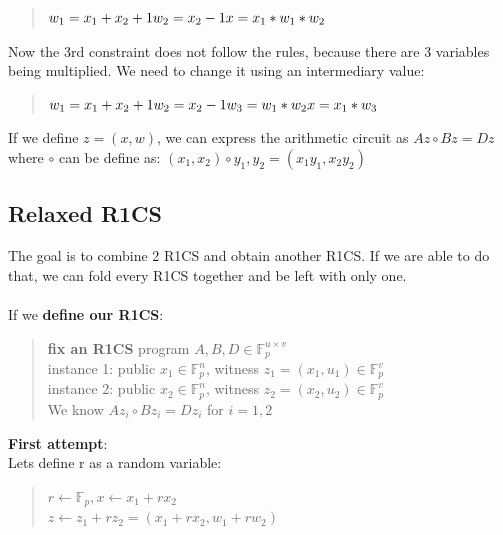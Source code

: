     \begin{quote}
    $w_1 = x_1+x_2+1
    \\
    w_2 = x_2 -1
    \\
    x = x_1*w_1*w_2$
    \end{quote}

    Now the 3rd constraint does not follow the rules, because there are 3 variables being multiplied.
    We need to change it using an intermediary value:
    
    \begin{quote}
    $w_1 = x_1+x_2+1
    \\
    w_2 = x_2 -1
    \\
    w_3 = w_1*w_2
    \\
    x = x_1*w_3$
    \end{quote}
    \cite{ZKM3}

    If we define $z=(x,w)$, we can express the arithmetic circuit as $ Az \circ Bz = Dz$
    where $\circ$ can be define as: $(x_1, x_2) \circ y_1, y_2 = (x_1y_1, x_2y_2)$
\cite{ZKM10}

\subsection{Relaxed R1CS}
The goal is to combine 2 R1CS and obtain another R1CS. If we are able to do that, we can fold every R1CS together and be left with only one.
\\
\\
If we \textbf{define our R1CS}:
\begin{quote}
\textbf{fix an R1CS} program $A,B,D \in \mathbb{F}^{u \times v}_p $
\\
instance 1: public $ x_1 \in \mathbb{F}^n_p $, witness $ z_1 = (x_1, u_1) \in \mathbb{F}^v_p$
\\
instance 2: public $x_2 \in \mathbb{F}^n_p $, witness $ z_2 = (x_2, u_2) \in \mathbb{F}^v_p$
\\
We know $Az_i \circ Bz_i = Dz_i$ for $ i = 1,2$
\end{quote}

\textbf{First attempt}: 
\\
Lets define r as a random variable:
\begin{quote}
$r \leftarrow \mathbb{F}_p, x \leftarrow x_1+rx_2$ 
\\
$z \leftarrow z_1 + rz_2 = (x_1+rx_2, w_1 + rw_2)$
\end{quote}

